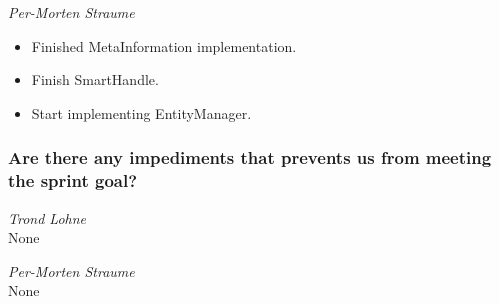 \documentclass{article}
\begin{document}
\medskip

\noindent\textit{Per-Morten Straume}
\begin{itemize}
	\item 
    Finished MetaInformation implementation.
	
	\item 
	Finish SmartHandle.
	
	\item 
	Start implementing EntityManager.
\end{itemize}


\subsubsection*{Are there any impediments that prevents us from meeting the sprint goal?}

\noindent\textit{Trond Lohne}\\
None

\medskip

\noindent\textit{Per-Morten Straume}\\
None
\end{document}
